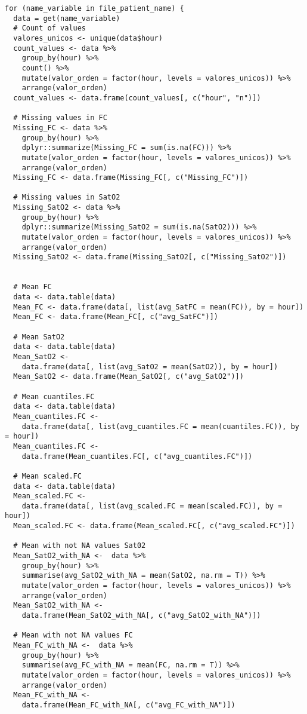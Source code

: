 \begin{lstlisting}[style=mystyle,caption={Cálculo de Medias y Cantidad de Valores Faltantes}, label={lst:medias-y-faltantes}]
  for (name_variable in file_patient_name) {
  data = get(name_variable)
  # Count of values
  valores_unicos <- unique(data$hour)
  count_values <- data %>%
    group_by(hour) %>%
    count() %>%
    mutate(valor_orden = factor(hour, levels = valores_unicos)) %>%
    arrange(valor_orden)
  count_values <- data.frame(count_values[, c("hour", "n")])
  
  # Missing values in FC
  Missing_FC <- data %>%
    group_by(hour) %>%
    dplyr::summarize(Missing_FC = sum(is.na(FC))) %>%
    mutate(valor_orden = factor(hour, levels = valores_unicos)) %>%
    arrange(valor_orden)
  Missing_FC <- data.frame(Missing_FC[, c("Missing_FC")])
  
  # Missing values in SatO2
  Missing_SatO2 <- data %>%
    group_by(hour) %>%
    dplyr::summarize(Missing_SatO2 = sum(is.na(SatO2))) %>%
    mutate(valor_orden = factor(hour, levels = valores_unicos)) %>%
    arrange(valor_orden)
  Missing_SatO2 <- data.frame(Missing_SatO2[, c("Missing_SatO2")])
  
  
  # Mean FC
  data <- data.table(data)
  Mean_FC <- data.frame(data[, list(avg_SatFC = mean(FC)), by = hour])
  Mean_FC <- data.frame(Mean_FC[, c("avg_SatFC")])
  
  # Mean SatO2
  data <- data.table(data)
  Mean_SatO2 <-
    data.frame(data[, list(avg_SatO2 = mean(SatO2)), by = hour])
  Mean_SatO2 <- data.frame(Mean_SatO2[, c("avg_SatO2")])
  
  # Mean cuantiles.FC
  data <- data.table(data)
  Mean_cuantiles.FC <-
    data.frame(data[, list(avg_cuantiles.FC = mean(cuantiles.FC)), by = hour])
  Mean_cuantiles.FC <-
    data.frame(Mean_cuantiles.FC[, c("avg_cuantiles.FC")])
  
  # Mean scaled.FC
  data <- data.table(data)
  Mean_scaled.FC <-
    data.frame(data[, list(avg_scaled.FC = mean(scaled.FC)), by = hour])
  Mean_scaled.FC <- data.frame(Mean_scaled.FC[, c("avg_scaled.FC")])
  
  # Mean with not NA values Sat02
  Mean_SatO2_with_NA <-  data %>%
    group_by(hour) %>%
    summarise(avg_SatO2_with_NA = mean(SatO2, na.rm = T)) %>%
    mutate(valor_orden = factor(hour, levels = valores_unicos)) %>%
    arrange(valor_orden)
  Mean_SatO2_with_NA <-
    data.frame(Mean_SatO2_with_NA[, c("avg_SatO2_with_NA")])
  
  # Mean with not NA values FC
  Mean_FC_with_NA <-  data %>%
    group_by(hour) %>%
    summarise(avg_FC_with_NA = mean(FC, na.rm = T)) %>%
    mutate(valor_orden = factor(hour, levels = valores_unicos)) %>%
    arrange(valor_orden)
  Mean_FC_with_NA <-
    data.frame(Mean_FC_with_NA[, c("avg_FC_with_NA")])
  

\end{lstlisting}
